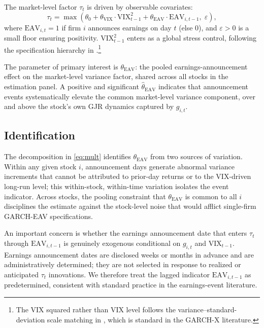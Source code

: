 \documentclass[12pt,a4paper]{article}
\begin{document}
The market-level factor $\tau_t$ is driven by observable covariates:
%
\begin{equation}
\tau_t = \max\!\left(
  \theta_0 + \theta_{\mathrm{VIX}} \cdot \mathrm{VIX}^2_{t-1}
           + \theta_{\mathrm{EAV}} \cdot \mathrm{EAV}_{i,t-1},\; \varepsilon
\right),
\label{eq:tau}
\end{equation}
%
where $\mathrm{EAV}_{i,t} = 1$ if firm $i$ announces earnings on day $t$
(else 0), and $\varepsilon > 0$ is a small floor ensuring positivity.
$\mathrm{VIX}_{t-1}^2$ enters as a global stress control, following the
specification hierarchy in \citet{engle2013}.\footnote{%
  The VIX squared rather than VIX level follows the variance--standard-deviation
  scale matching in \citet{engle_rangel2008}, which is standard in the GARCH-X
  literature.}

The parameter of primary interest is $\theta_{\mathrm{EAV}}$: the pooled
earnings-announcement effect on the market-level variance factor, shared
across all stocks in the estimation panel. A positive and significant
$\hat{\theta}_{\mathrm{EAV}}$ indicates that announcement events systematically
elevate the common market-level variance component, over and above the stock's
own GJR dynamics captured by $g_{i,t}$.

\subsection{Identification}

The decomposition in \eqref{eq:mult} identifies $\theta_{\mathrm{EAV}}$
from two sources of variation. Within any given stock $i$, announcement days
generate abnormal variance increments that cannot be attributed to prior-day
returns or to the VIX-driven long-run level; this within-stock, within-time
variation isolates the event indicator. Across stocks, the pooling constraint
that $\theta_{\mathrm{EAV}}$ is common to all $i$ disciplines the estimate
against the stock-level noise that would afflict single-firm GARCH-EAV
specifications.

An important concern is whether the earnings announcement date that enters
$\tau_t$ through $\mathrm{EAV}_{i,t-1}$ is genuinely exogenous conditional on
$g_{i,t}$ and $\mathrm{VIX}_{t-1}$. Earnings announcement dates are disclosed
weeks or months in advance \citep[see, e.g.,][]{patell1976} and are
administratively determined; they are not selected in response to realized
or anticipated $\tau_t$ innovations. We therefore treat the lagged indicator
$\mathrm{EAV}_{i,t-1}$ as predetermined, consistent with standard practice in
the earnings-event literature.
\end{document}
